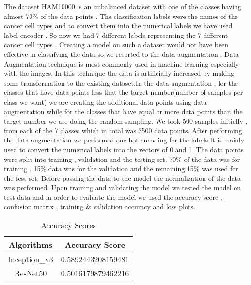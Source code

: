 \documentclass[conference]{IEEEtran}
\begin{document}
The dataset HAM10000 is an imbalanced dataset with one of the classes having almost 70\% of the data points . The classification labels were the names of the cancer cell types and to convert them into the numerical labels we have used label encoder . So now we had 7 different labels representing the 7 different cancer cell types . Creating a model on such a dataset would not have  been effective in classifying the data so we resorted to the data augmentation .
Data Augmentation technique is most commonly used in machine learning especially with the images. In this technique the data is artificially increased by making  some transformation to the existing dataset.In the data augmentation , for the classes that have data points less that the target number(number of samples per class we want) we are creating the additional data points using data augmentation while for the classes that have equal or more data points than the target number  we are doing the random sampling. We took 500 samples initially ,  from each of the 7 classes which in total was 3500 data points. After performing the data augmentation we performed one hot encoding for the labels.It is mainly used to convert the numerical labels into the vectors of 0 and 1 .The data points were split into training , validation and the testing set. 70\% of the data was for training , 15\% data was for the validation and the remaining 15\% was used for the test set. Before passing the data to the model the normalization of the data was performed. Upon training and validating the model we tested the model on test data and in order to evaluate the model we used the accuracy score , confusion matrix , training \& validation accuracy and loss plots.

\begin{table}[htbp]
  \centering
  \begin{tabular}{|c|c|}
    \hline
    Algorithms & Accuracy Score \\
    \hline
    Inception\_v3 & 0.5892443208159481 \\
    \hline
    ResNet50 & 0.5016179879462216 \\
    \hline
  \end{tabular}
  \caption{Accuracy Scores }
  \label{tab:mytable}
\end{table}
\end{document}
